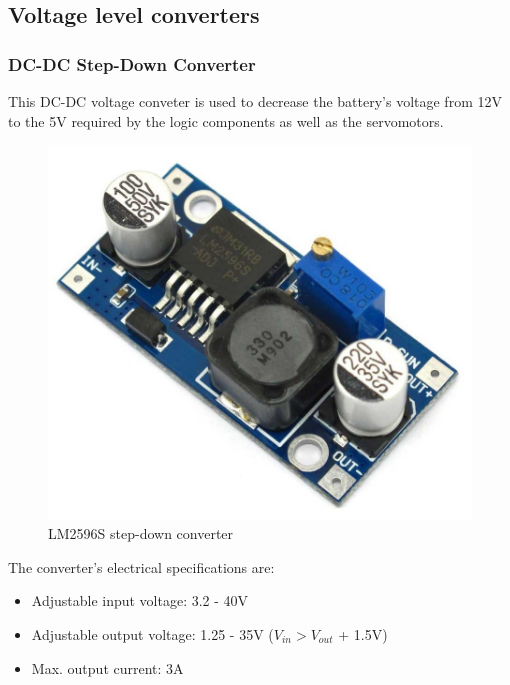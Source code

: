 \newpage
\subsection{Voltage level converters}	
	
	\subsubsection{DC-DC Step-Down Converter}

		This DC-DC voltage conveter is used to decrease the battery's voltage from 12V to the 5V required by the logic components as well as the servomotors.

			\begin{figure}[H]
					\centering
					\includegraphics[scale=0.2]{images/ProjectComponents/buck.jpg}
					\caption{LM2596S step-down converter }
					\label{}
			\end{figure}
			\bigskip

		The converter's electrical specifications are:
			\begin{itemize}
				\item Adjustable input voltage: 3.2 - 40V
				\item Adjustable output voltage: 1.25 - 35V ($V_{in} > V_{out}$ + 1.5V)       
				\item Max. output current: 3A
			\end{itemize}

